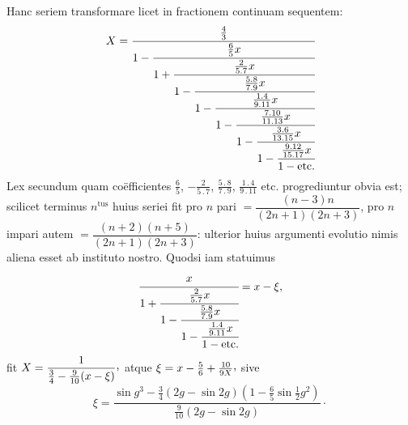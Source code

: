 Hanc seriem transformare licet in fractionem continuam sequentem:
\[
X=\cfrac{\tfrac43}{1-\cfrac{\tfrac65x}{1+\cfrac{\tfrac{2}{5\mathbin{.}7}x}{1-\cfrac{\tfrac{5\mathbin{.}8}{7\mathbin{.}9}x}{1-\cfrac{\tfrac{1\mathbin{.}4}{9\mathbin{.}11}x}{1-\cfrac{\tfrac{7\mathbin{.}10}{11\mathbin{.}13}x}{1-\cfrac{\tfrac{3\mathbin{.}6}{13\mathbin{.}15}x}{1-\cfrac{\tfrac{9\mathbin{.}12}{15\mathbin{.}17}x}{1-\text{etc.}}}}}}}}}
\]
Lex secundum quam coëfficientes $\tfrac65$, $-\tfrac{2}{5\mathbin{.}7}$, $\tfrac{5\mathbin{.}8}{7\mathbin{.}9}$, $\tfrac{1\mathbin{.}4}{9\mathbin{.}11}$ etc. progrediuntur obvia est; scilicet terminus $n^{\mathrm{tus}}$ huius seriei fit pro $n$ pari $=\dfrac{(n-3)n}{(2n+1)(2n+3)}$, pro $n$ impari autem $=\dfrac{(n+2)(n+5)}{(2n+1)(2n+3)}$: ulterior huius argumenti evolutio\HistoricalNoteEight{Vgl. Band III. S. 135.]} nimis aliena esset ab instituto nostro. Quodsi iam statuimus
\[
\cfrac{x}{1+\cfrac{\tfrac{2}{5\mathbin{.}7}x}{1-\cfrac{\tfrac{5\mathbin{.}8}{7\mathbin{.}9}x}{1-\cfrac{\tfrac{1\mathbin{.}4}{9\mathbin{.}11}x}{1-\text{etc.}}}}}=x-\xi,
\]
fit $X=\dfrac{1}{\frac34-\frac{9}{10}(x-\xi)}\mathpunct{\raisebox{.45ex}{,}}$ atque $\xi=x-\frac56+\frac{10}{9X}\mathpunct{\raisebox{.45ex}{,}}$ sive
\[
\xi=\dfrac{\sin g^3-\frac34(2g-\sin 2g)(1-\frac65\sin\frac12 g^2)}{\frac{9}{10}(2g-\sin 2g)}\mathpunct{\cdot}
\]


